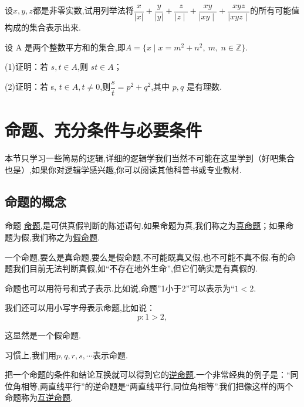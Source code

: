 \documentclass[lang=cn,math=cm,chinesefont=nofont,11pt,scheme=chinese,twocol]{elegantbook}
\begin{document}
\begin{exercise}\label{exer:17}
  设$x,y,z$都是非零实数,试用列举法将$\dfrac x{|x|}+\dfrac y{|y|}+{\dfrac{z}{\mid z\mid}}+{\dfrac{xy}{\mid xy\mid}}+{\dfrac{xyz}{\mid xyz\mid}}$的所有可能值构成的集合表示出来.
\end{exercise}

\begin{exercise}\label{exer:18}
  设 A 是两个整数平方和的集合,即$A=\{x\mid x=m^2+n^2,\:m,\:n\in\mathbb{Z}\}.$

(1)证明：若 $s,t{\in}A$,则 $st{\in}A$；

(2)证明：若 s, $t\in A,t\neq0$,则$\dfrac st=p^2+q^2$,其中 $p,q$ 是有理数.
\end{exercise}

\section{命题、充分条件与必要条件}
本节只学习一些简易的逻辑,详细的逻辑学我们当然不可能在这里学到（好吧集合也是）,如果你对逻辑学感兴趣,你可以阅读其他科普书或专业教材.

\subsection{命题的概念}

\begin{definition}{命题}
  \underline{命题},是可供真假判断的陈述语句.如果命题为真,我们称之为\underline{真命题}；如果命题为假,我们称之为\underline{假命题}.
\end{definition}

\begin{remark}
  一个命题,要么是真命题,要么是假命题,不可能既真又假,也不可能不真不假.有的命题我们目前无法判断真假,如“不存在地外生命”,但它们确实是有真假的.
\end{remark}

命题也可以用符号和式子表示.比如说,命题”1小于2”可以表示为“$1<2$.

我们还可以用小写字母表示命题,比如说：$$p:1>2,$$

这显然是一个假命题.

习惯上,我们用$p,q,r,s,\cdots$表示命题.

\hspace*{\fill}

把一个命题的条件和结论互换就可以得到它的\underline{逆命题}.一个非常经典的例子是：“同位角相等,两直线平行”的逆命题是“两直线平行,同位角相等”.我们把像这样的两个命题称为\underline{互逆命题}.
\end{document}
